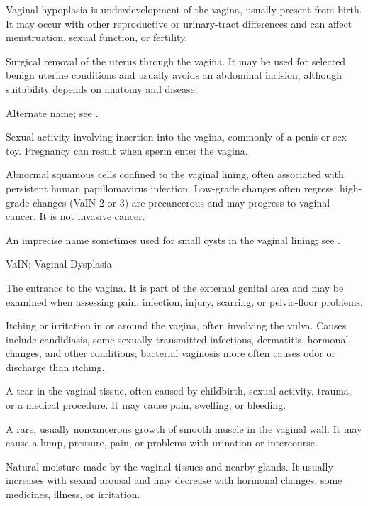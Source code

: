  Vaginal hypoplasia is underdevelopment of the vagina, usually present from birth. It may occur with other reproductive or urinary-tract differences and can affect menstruation, sexual function, or fertility.

 Surgical removal of the uterus through the vagina. It may be used for selected benign uterine conditions and usually avoids an abdominal incision, although suitability depends on anatomy and disease.

 Alternate name; see .

 Sexual activity involving insertion into the vagina, commonly of a penis or sex toy. Pregnancy can result when sperm enter the vagina.

 Abnormal squamous cells confined to the
vaginal lining, often associated with persistent human papillomavirus infection. Low-grade
changes often regress; high-grade changes (VaIN 2 or 3) are precancerous and may progress
to vaginal cancer. It is not invasive cancer.

 An imprecise name sometimes used for small cysts in the vaginal lining; see .

\synonyms
VaIN; Vaginal Dysplasia

 The entrance to the vagina. It is part of the external genital area and may be examined when assessing pain, infection, injury, scarring, or pelvic-floor problems.

 Itching or irritation in or around the vagina, often involving the vulva. Causes include candidiasis, some sexually transmitted infections, dermatitis, hormonal changes, and other conditions; bacterial vaginosis more often causes odor or discharge than itching.

 A tear in the vaginal tissue, often caused by childbirth, sexual activity, trauma, or a medical procedure. It may cause pain, swelling, or bleeding.

 A rare, usually noncancerous growth of smooth muscle in the vaginal wall. It may cause a lump, pressure, pain, or problems with urination or intercourse.

 Natural moisture made by the vaginal tissues and nearby glands. It usually increases with sexual arousal and may decrease with hormonal changes, some medicines, illness, or irritation.

